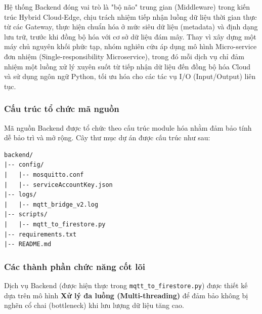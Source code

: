 

Hệ thống Backend đóng vai trò là "bộ não" trung gian (Middleware) trong kiến trúc Hybrid Cloud-Edge, chịu trách nhiệm tiếp nhận luồng dữ liệu thời gian thực từ các Gateway, 
thực hiện chuẩn hóa ở mức siêu dữ liệu (metadata) và định dạng lưu trữ, trước khi đồng bộ hóa với cơ sở dữ liệu đám mây. Thay vì xây dựng một máy chủ nguyên khối phức tạp, nhóm nghiên cứu áp dụng mô hình Micro-service đơn nhiệm (Single-responsibility Microservice), trong đó mỗi dịch vụ chỉ đảm nhiệm một luồng xử lý xuyên suốt từ tiếp nhận dữ liệu đến đồng bộ hóa Cloud và sử dụng ngôn ngữ Python, tối ưu hóa cho các tác vụ I/O (Input/Output) liên tục.

\subsubsection{Cấu trúc tổ chức mã nguồn}
Mã nguồn Backend được tổ chức theo cấu trúc module hóa nhằm đảm bảo tính dễ bảo trì và mở rộng. Cây thư mục dự án được cấu trúc như sau:

\begin{verbatim}
backend/
|-- config/
|   |-- mosquitto.conf        
|   |-- serviceAccountKey.json 
|-- logs/
|   |-- mqtt_bridge_v2.log    
|-- scripts/
|   |-- mqtt_to_firestore.py  
|-- requirements.txt         
|-- README.md                 
\end{verbatim}

\subsubsection{Các thành phần chức năng cốt lõi}
Dịch vụ Backend (được hiện thực trong \texttt{mqtt\_to\_firestore.py}) được thiết kế dựa trên mô hình \textbf{Xử lý đa luồng (Multi-threading)} để đảm bảo không bị nghẽn cổ chai (bottleneck) khi lưu lượng dữ liệu tăng cao.

